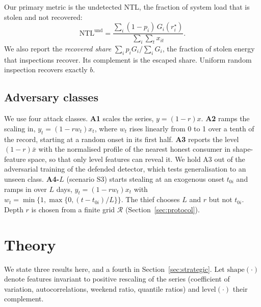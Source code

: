 \documentclass[journal]{IEEEtran}
\newcommand{\NTL}{\mathrm{NTL}}
\begin{document}
Our primary metric is the undetected NTL, the fraction of system load that is stolen and not recovered:
\begin{equation}
\NTL^{\mathrm{und}}=\frac{\sum_{i}(1-p_i)\,G_i(r_i^\star)}{\sum_i\sum_t x_{it}}.
\end{equation}
We also report the \emph{recovered share} $\sum_i p_iG_i/\sum_i G_i$, the fraction of stolen energy that inspections recover. Its complement is the escaped share. Uniform random inspection recovers exactly $b$.

\subsection{Adversary classes}
We use four attack classes. \textbf{A1} scales the series, $y=(1-r)x$. \textbf{A2} ramps the scaling in, $y_t=(1-rw_t)x_t$, where $w_t$ rises linearly from 0 to 1 over a tenth of the record, starting at a random onset in its first half. \textbf{A3} reports the level $(1-r)\bar x$ with the normalised profile of the nearest honest consumer in shape-feature space, so that only level features can reveal it. We hold A3 out of the adversarial training of the defended detector, which tests generalisation to an unseen class. \textbf{A4-$L$} (scenario S3) starts stealing at an exogenous onset $t_{0i}$ and ramps in over $L$ days, $y_t=(1-rw_t)x_t$ with $w_t=\min\{1,\max\{0,(t-t_{0i})/L\}\}$. The thief chooses $L$ and $r$ but not $t_{0i}$. Depth $r$ is chosen from a finite grid $\mathcal{R}$ (Section~\ref{sec:protocol}).

\section{Theory}\label{sec:theory}
We state three results here, and a fourth in Section~\ref{sec:strategic}. Let $\mathrm{shape}(\cdot)$ denote features invariant to positive rescaling of the series (coefficient of variation, autocorrelations, weekend ratio, quantile ratios) and $\mathrm{level}(\cdot)$ their complement.
\end{document}

